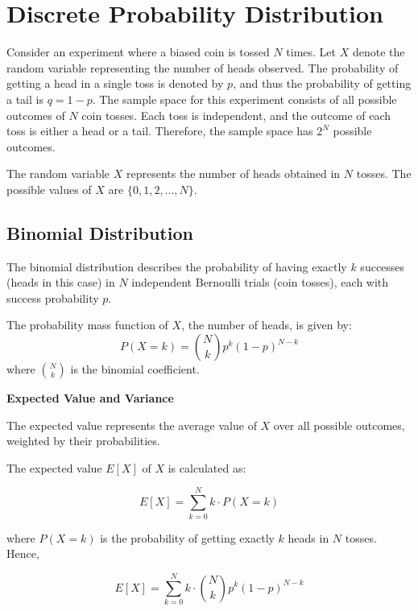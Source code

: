 \section{Discrete Probability Distribution}

Consider an experiment where a biased coin is tossed $N$ times. Let $X$ denote the random variable representing the number of heads observed. The probability of getting a head in a single toss is denoted by $p$, and thus the probability of getting a tail is $q = 1 - p$. The sample space for this experiment consists of all possible outcomes of $N$ coin tosses. Each toss is independent, and the outcome of each toss is either a head or a tail. Therefore, the sample space has $2^N$ possible outcomes.

The random variable $X$ represents the number of heads obtained in $N$ tosses. The possible values of $X$ are $\{0, 1, 2, \ldots, N\}$.

\subsection{Binomial Distribution}

\begin{definition}
    The binomial distribution describes the probability of having exactly $k$ successes (heads in this case) in $N$ independent Bernoulli trials (coin tosses), each with success probability $p$.
\end{definition}

The probability mass function of $X$, the number of heads, is given by:
\[
    P(X = k) = \binom{N}{k} p^k (1 - p)^{N - k}
\]
where $\binom{N}{k}$ is the binomial coefficient.

\vspace{8pt}
\textbf{Expected Value and Variance}

\begin{definition}
    The expected value represents the average value of $X$ over all possible outcomes, weighted by their probabilities.
\end{definition}

The expected value \( E[X] \) of \( X \) is calculated as:

\[
    E[X] = \sum_{k=0}^{N} k \cdot P(X=k)
\]

where \( P(X=k) \) is the probability of getting exactly \( k \) heads in \( N \) tosses. Hence,

\[
    E[X] = \sum_{k=0}^{N} k \cdot \binom{N}{k} p^k (1-p)^{N-k}
\]

